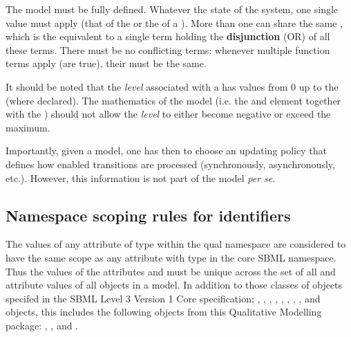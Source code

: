 The model must be fully defined. Whatever the state of the system, one single value must apply (that of the \DefaultTerm or the  of a \FunctionTerm). More than one \FunctionTerm can share the same , which is the equivalent to a single term holding the {\bf disjunction} (OR) of all these terms.  There must be no conflicting terms:  whenever multiple function terms apply (are true), their  must be the same. 

It should be noted that the \emph{level} associated with a  has values from 0 up to the  (where declared). The mathematics of the model (i.e. the \FunctionTerm and \DefaultTerm element together with the ) should not allow the \emph{level} to either become negative or exceed the maximum.

Importantly, given a model, one has then to choose an updating policy that defines how enabled transitions are processed (synchronously, asynchronously, etc.). However, this information is not part of the model {\em per se}. 


\subsection{Namespace scoping rules for identifiers}
\label{sec:ns-id}

The values of any  attribute  of type  within the qual namespace are considered to have the same scope as any  attribute with type  in the core SBML namespace. Thus the values of the attributes
   and  must be unique across the set of all  and
   attribute values of all objects in a model. In addition to those classes of objects specifed in the SBML Level 3 Version 1 Core specification;
  \Model, \FunctionDefinition, \Compartment,
  \Species, \Reaction, \SpeciesReference, \ModifierSpeciesReference,
  \Event, and \Parameter objects, this includes the following objects from this Qualitative Modelling package: , \Transition, 
  \Input and \Output.
